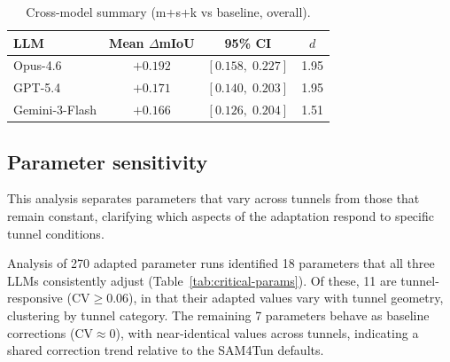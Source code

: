 \documentclass[a4paper,fleqn]{cas-dc}
\begin{document}
{\begin{table}[ht]
\caption{Cross-model summary (m+s+k vs baseline, overall).}\label{tab:cross-model}
\begin{tabular*}{\tblwidth}{@{} l c c c @{}}
\toprule
LLM & Mean $\Delta$mIoU & 95\% CI & \mbox{$d$} \\
\midrule
Opus-4.6 & $+0.192$ & $[0.158,\; 0.227]$ & 1.95 \\
GPT-5.4 & $+0.171$ & $[0.140,\; 0.203]$ & 1.95 \\
Gemini-3-Flash & $+0.166$ & $[0.126,\; 0.204]$ & 1.51 \\
\bottomrule
\end{tabular*}
\end{table}

\subsection{Parameter sensitivity}\label{sec:sensitivity}

This analysis separates parameters that vary across tunnels from those that remain constant, clarifying which aspects of the adaptation respond to specific tunnel conditions.

Analysis of 270 adapted parameter runs identified 18 parameters that all three LLMs consistently adjust (Table~\ref{tab:critical-params}). Of these, 11 are tunnel-responsive ($\text{CV} \geq 0.06$), in that their adapted values vary with tunnel geometry, clustering by tunnel category. The remaining 7 parameters behave as baseline corrections ($\text{CV} \approx 0$), with near-identical values across tunnels, indicating a shared correction trend relative to the SAM4Tun defaults.

}
\end{document}
